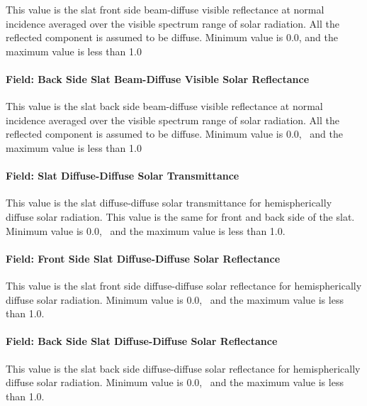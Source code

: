 This value is the slat front side beam-diffuse visible reflectance at normal incidence averaged over the visible spectrum range of solar radiation. All the reflected component is assumed to be diffuse. Minimum value is 0.0, and the maximum value is less than 1.0

\paragraph{Field: Back Side Slat Beam-Diffuse Visible Solar Reflectance}\label{field-back-side-slat-beam-diffuse-visible-solar-reflectance}

This value is the slat back side beam-diffuse visible reflectance at normal incidence averaged over the visible spectrum range of solar radiation. All the reflected component is assumed to be diffuse. Minimum value is 0.0,~ and the maximum value is less than 1.0

\paragraph{Field: Slat Diffuse-Diffuse Solar Transmittance}\label{field-slat-diffuse-diffuse-solar-transmittance}

This value is the slat diffuse-diffuse solar transmittance for hemispherically diffuse solar radiation. This value is the same for front and back side of the slat.~ Minimum value is 0.0,~ and the maximum value is less than 1.0.

\paragraph{Field: Front Side Slat Diffuse-Diffuse Solar Reflectance}\label{field-front-side-slat-diffuse-diffuse-solar-reflectance}

This value is the slat front side diffuse-diffuse solar reflectance for hemispherically diffuse solar radiation. Minimum value is 0.0,~ and the maximum value is less than 1.0.

\paragraph{Field: Back Side Slat Diffuse-Diffuse Solar Reflectance}\label{field-back-side-slat-diffuse-diffuse-solar-reflectance}

This value is the slat back side diffuse-diffuse solar reflectance for hemispherically diffuse solar radiation. Minimum value is 0.0,~ and the maximum value is less than 1.0.

